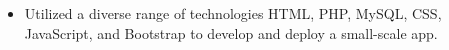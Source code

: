 


\begin{itemize}
    \item Utilized a diverse range of technologies HTML, PHP, MySQL, CSS, JavaScript, and Bootstrap to develop and deploy a small-scale app.
\end{itemize}